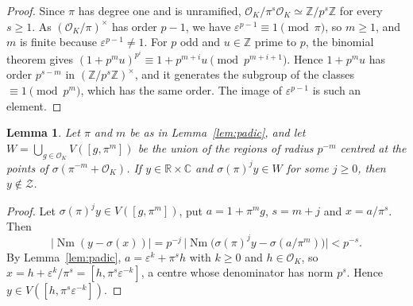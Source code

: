 \documentclass[11pt]{amsart}
\newtheorem{lemma}[theorem]{Lemma}
\theoremstyle{definition}
\theoremstyle{remark}
\numberwithin{equation}{section}
\newcommand{\Z}{\mathbb{Z}}
\newcommand{\R}{\mathbb{R}}
\newcommand{\C}{\mathbb{C}}
\newcommand{\cO}{\mathcal{O}}
\newcommand{\Nm}{\operatorname{Nm}}
\begin{document}
\begin{proof}
Since $\pi$ has degree one and is unramified, $\cO_K/\pi^s\cO_K\simeq\Z/p^s\Z$ for every
$s\ge1$. As $(\cO_K/\pi)^\times$ has order $p-1$, we have $\varepsilon^{p-1}\equiv1\pmod\pi$, so
$m\ge1$, and $m$ is finite because $\varepsilon^{p-1}\ne1$. For $p$ odd and $u\in\Z$ prime to $p$,
the binomial theorem gives $(1+p^mu)^{p^i}\equiv1+p^{m+i}u\pmod{p^{m+i+1}}$. Hence $1+p^mu$
has order $p^{s-m}$ in $(\Z/p^s\Z)^\times$, and it generates the subgroup of the classes
$\equiv1\pmod{p^m}$, which has the same order. The image of $\varepsilon^{p-1}$ is such an
element.
\end{proof}

\begin{lemma}\label{lem:tower}
Let $\pi$ and $m$ be as in Lemma~\ref{lem:padic}, and let $W=\bigcup_{g\in\cO_K}V([g,\pi^m])$ be
the union of the regions of radius $p^{-m}$ centred at the points of
$\sigma(\pi^{-m}+\cO_K)$. If $y\in\R\times\C$ and $\sigma(\pi)^jy\in W$ for some $j\ge0$, then
$y\notin \mathcal Z$.
\end{lemma}

\begin{proof}
Let $\sigma(\pi)^jy\in V([g,\pi^m])$, put $a=1+\pi^mg$, $s=m+j$ and $x=a/\pi^s$. Then
\[
  |\Nm(y-\sigma(x))|=p^{-j}\,\bigl|\Nm\bigl(\sigma(\pi)^jy-\sigma(a/\pi^m)\bigr)\bigr|<p^{-s}.
\]
By Lemma~\ref{lem:padic}, $a=\varepsilon^k+\pi^sh$ with $k\ge0$ and $h\in\cO_K$, so
$x=h+\varepsilon^k/\pi^s=[h,\pi^s\varepsilon^{-k}]$, a centre whose denominator has norm $p^s$.
Hence $y\in V([h,\pi^s\varepsilon^{-k}])$.
\end{proof}
\end{document}
